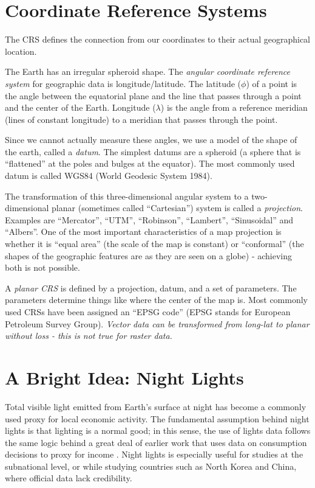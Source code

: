 \documentclass[12pt]{article}
\begin{document}
\section{Coordinate Reference Systems}\label{sec2}

The CRS defines the connection from our coordinates to their actual geographical location.

The Earth has an irregular spheroid shape. The \textit{angular coordinate reference system} for geographic data is longitude/latitude. The latitude ($\phi$) of a point is the angle between the equatorial plane and the line that passes through a point and the center of the Earth. Longitude ($\lambda$) is the angle from a reference meridian (lines of constant longitude) to a meridian that passes through the point. 

Since we cannot actually measure these angles, we use a model of the shape of the earth, called a \textit{datum}. The simplest datums are a spheroid (a sphere that is “flattened” at the poles and bulges at the equator). The most commonly used datum is called WGS84 (World Geodesic System 1984).

The transformation of this three-dimensional angular system to a two-dimensional planar (sometimes called “Cartesian”) system is called a \textit{projection}. Examples are “Mercator”, “UTM”, “Robinson”, “Lambert”, “Sinusoidal” and “Albers”. One of the most important characteristics of a map projection is whether it is “equal area” (the scale of the map is constant) or “conformal” (the shapes of the geographic features are as they are seen on a globe) - achieving both is not possible.

A \textit{planar CRS} is defined by a projection, datum, and a set of parameters. The parameters determine things like where the center of the map is. Most commonly used CRSs have been assigned an “EPSG code” (EPSG stands for European Petroleum Survey Group). \textit{Vector data can be transformed from long-lat to planar without loss - this is not true for raster data.}


\section{A Bright Idea: Night Lights}

Total visible light emitted from Earth’s surface at night has become a commonly used proxy for local economic activity. The fundamental assumption behind night lights is that lighting is a normal good; in this sense, the use of lights data follows the same logic behind a great deal of earlier work that uses data on consumption decisions to proxy for income \parencite{donaldson2016}. Night lights is especially useful for studies at the subnational level, or while studying countries such as North Korea and China, where official data lack credibility.
\end{document}
